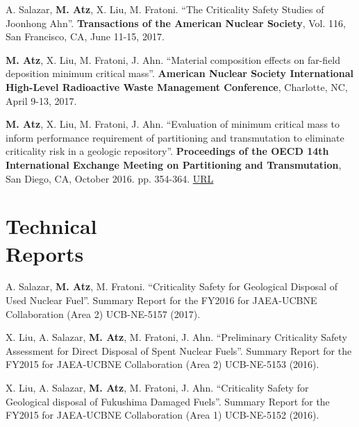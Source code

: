 \documentclass[margin,line]{resume}
\begin{document}
\begin{resume}
\begin{bibenum}
    \item A. Salazar, \textbf{M. Atz}, X. Liu, M. Fratoni. ``The Criticality Safety Studies of Joonhong Ahn''. \textbf{Transactions of the American Nuclear Society}, Vol. 116, San Francisco, CA, June 11-15, 2017.

    \item \textbf{M. Atz}, X. Liu, M. Fratoni, J. Ahn. ``Material composition effects on far-field deposition minimum critical mass''. \textbf{American Nuclear Society International High-Level Radioactive Waste Management Conference}, Charlotte, NC, April 9-13, 2017.

    \item \textbf{M. Atz}, X. Liu, M. Fratoni, J. Ahn. ``Evaluation of minimum critical mass to inform performance requirement of partitioning and transmutation to eliminate criticality risk in a geologic repository''. \textbf{Proceedings of the OECD 14th International Exchange Meeting on Partitioning and Transmutation}, San Diego, CA, October 2016. pp. 354-364. \href{https://www.oecd-nea.org/science/docs/2017/nsc-r2017-3.pdf}{URL} 

\end{bibenum}


\section{\mysidestyle Technical\\Reports}
\begin{bibenum}

    \item A. Salazar, \textbf{M. Atz}, M. Fratoni. ``Criticality Safety for Geological Disposal of Used Nuclear Fuel''. Summary Report for the FY2016 for JAEA-UCBNE Collaboration (Area 2) UCB-NE-5157 (2017).
    
    \item X. Liu, A. Salazar, \textbf{M. Atz}, M. Fratoni, J. Ahn. ``Preliminary Criticality Safety Assessment for Direct Disposal of Spent Nuclear
	Fuels''. Summary Report for the FY2015 for JAEA-UCBNE Collaboration (Area 2) UCB-NE-5153 (2016).
	
	\item X. Liu, A. Salazar, \textbf{M. Atz}, M. Fratoni, J. Ahn. ``Criticality Safety for Geological disposal of Fukushima Damaged Fuels''. Summary Report for the FY2015 for JAEA-UCBNE Collaboration (Area 1) UCB-NE-5152 (2016).


\end{bibenum}
\end{resume}
\end{document}
